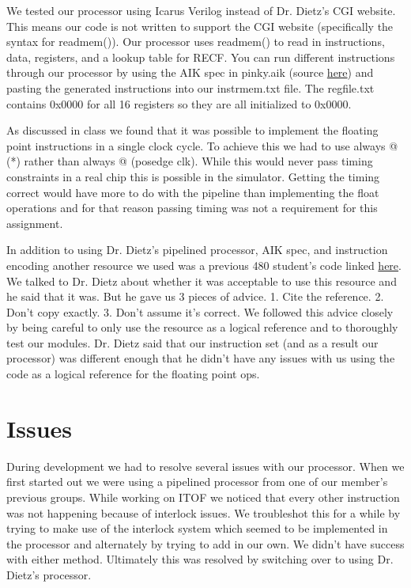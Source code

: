 \documentclass{article}
\begin{document}
\begin{multicols}{2}
We tested our processor using Icarus Verilog instead of Dr. Dietz's CGI website. This means our code is not written to support the CGI website (specifically the syntax for readmem()). Our processor uses readmem() to read in instructions, data, registers, and a lookup table for RECF. You can run different instructions through our processor by using the AIK spec in pinky.aik (source \href{http://aggregate.org/EE480/PinKY.aik}{here}) and pasting the generated instructions into our instrmem.txt file. The regfile.txt contains 0x0000 for all 16 registers so they are all initialized to 0x0000.

As discussed in class we found that it was possible to implement the floating point instructions in a single clock cycle. To achieve this we had to use always @ (*) rather than always @ (posedge clk). While this would never pass timing constraints in a real chip this is possible in the simulator. Getting the timing correct would have more to do with the pipeline than implementing the float operations and for that reason passing timing was not a requirement for this assignment.

In addition to using Dr. Dietz's pipelined processor, AIK spec, and instruction encoding another resource we used was a previous 480 student's code linked \href{https://github.com/darthburkhart/Project4/blob/master/floatpipe.v} {here}. We talked to Dr. Dietz about whether it was acceptable to use this resource and he said that it was. But he gave us 3 pieces of advice. 1. Cite the reference.  2. Don't copy exactly. 3. Don't assume it's correct. We followed this advice closely by being careful to only use the resource as a logical reference and to thoroughly test our modules. Dr. Dietz said that our instruction set (and as a result our processor) was different enough that he didn't have any issues with us using the code as a logical reference for the floating point ops.

  \section{Issues}
During development we had to resolve several issues with our processor. When we first started out we were using a pipelined processor from one of our member's previous groups. While working on ITOF we noticed that every other instruction was not happening because of interlock issues. We troubleshot this for a while by trying to make use of the interlock system which seemed to be implemented in the processor and alternately by trying to add in our own. We didn't have success with either method. Ultimately this was resolved by switching over to using Dr. Dietz's processor.


\end{multicols}
\end{document}
